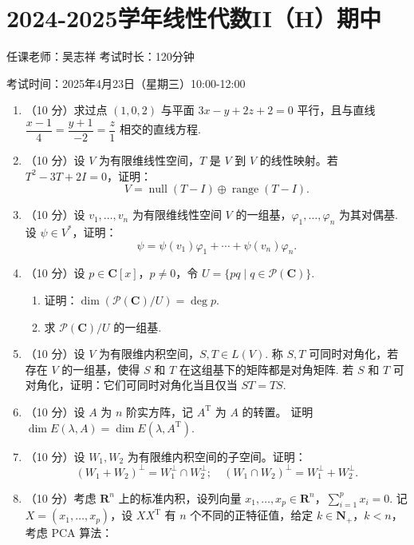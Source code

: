 \section{2024-2025学年线性代数II（H）期中}

\begin{center}
    任课老师：吴志祥\hspace{4em} 考试时长：120分钟

    考试时间：2025年4月23日（星期三）10:00-12:00
\end{center}

\begin{enumerate}
    \item （10 分）求过点 $(1, 0, 2)$ 与平面 $3x - y + 2z + 2 = 0$ 平行，且与直线 $\dfrac{x-1}{4}=\dfrac{y+1}{-2}=\dfrac{z}{1}$ 相交的直线方程.
    \item （10 分）设 $V$ 为有限维线性空间，$T$ 是 $V$ 到 $V$ 的线性映射。若 $T^2 - 3T + 2I = 0$，证明：
    \[V = \operatorname{null}(T - I) \oplus \operatorname{range}(T - I).\]
    \item （10 分）设 $v_1, \ldots, v_n$ 为有限维线性空间 $V$ 的一组基，$\varphi_1, \ldots, \varphi_n$ 为其对偶基. 设 $\psi \in V^*$，证明：
    \[\psi = \psi(v_1)\varphi_1 + \cdots + \psi(v_n)\varphi_n.\]
    \item （10 分）设 $p \in \mathbf{C}[x]$，$p \neq 0$，令 $U = \{pq \mid q \in \mathcal{P}(\mathbf{C})\}$.
    \begin{enumerate}
        \item 证明：$\dim(\mathcal{P}(\mathbf{C}) / U) = \deg p$.
        \item 求 $\mathcal{P}(\mathbf{C}) / U$ 的一组基.
    \end{enumerate}
    \item （10 分）设 $V$ 为有限维内积空间，$S, T \in L(V)$. 称 $S,T$ 可同时对角化，若存在 $V$ 的一组基，使得 $S$ 和 $T$ 在这组基下的矩阵都是对角矩阵. 若 $S$ 和 $T$ 可对角化，证明：它们可同时对角化当且仅当 $ST = TS$.
    \item （10 分）设 $A$ 为 $n$ 阶实方阵，记 $A^\mathrm{T}$ 为 $A$ 的转置。 证明 $\dim E(\lambda, A) = \dim E(\lambda, A^\mathrm{T})$.
    \item （10 分）设 $W_1, W_2$ 为有限维内积空间的子空间。证明：
    \[(W_1 + W_2)^\perp = W_1^\perp \cap W_2^\perp;\quad (W_1 \cap W_2)^\perp = W_1^\perp + W_2^\perp.\]
    \item （10 分）考虑 $\mathbf{R}^n$ 上的标准内积，设列向量 $x_1,\ldots,x_p\in\mathbf{R}^n$，$\displaystyle\sum_{i=1}^p x_i=0$. 记 $X=(x_1,\ldots,x_p)$，设 $XX^\mathrm{T}$ 有 $n$ 个不同的正特征值，给定 $k\in\mathbf{N}_+$，$k<n$，考虑 PCA 算法：

\end{enumerate}
